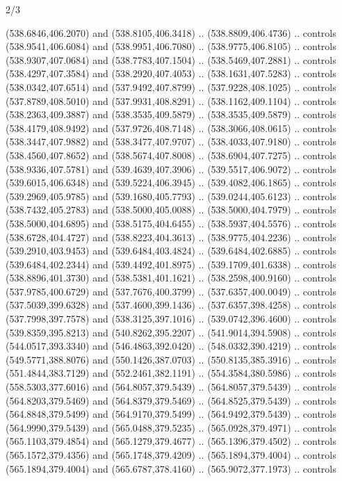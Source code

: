 \begin{flagdescription}{2/3}
\begin{scope}[xshift=0.5\flaglength,yshift=0.5\flagwidth,scale=\flagwidth/495.65]
\begin{scope}[y=0.8pt, x=0.8pt, yscale=-1,shift={(-463.76,-309.78)}]
  (538.6846,406.2070) and (538.8105,406.3418) .. (538.8809,406.4736) .. controls
  (538.9541,406.6084) and (538.9951,406.7080) .. (538.9775,406.8105) .. controls
  (538.9307,407.0684) and (538.7783,407.1504) .. (538.5469,407.2881) .. controls
  (538.4297,407.3584) and (538.2920,407.4053) .. (538.1631,407.5283) .. controls
  (538.0342,407.6514) and (537.9492,407.8799) .. (537.9228,408.1025) .. controls
  (537.8789,408.5010) and (537.9931,408.8291) .. (538.1162,409.1104) .. controls
  (538.2363,409.3887) and (538.3535,409.5879) .. (538.3535,409.5879) .. controls
  (538.4179,408.9492) and (537.9726,408.7148) .. (538.3066,408.0615) .. controls
  (538.3447,407.9882) and (538.3477,407.9707) .. (538.4033,407.9180) .. controls
  (538.4560,407.8652) and (538.5674,407.8008) .. (538.6904,407.7275) .. controls
  (538.9336,407.5781) and (539.4639,407.3906) .. (539.5517,406.9072) .. controls
  (539.6015,406.6348) and (539.5224,406.3945) .. (539.4082,406.1865) .. controls
  (539.2969,405.9785) and (539.1680,405.7793) .. (539.0244,405.6123) .. controls
  (538.7432,405.2783) and (538.5000,405.0088) .. (538.5000,404.7979) .. controls
  (538.5000,404.6895) and (538.5175,404.6455) .. (538.5937,404.5576) .. controls
  (538.6728,404.4727) and (538.8223,404.3613) .. (538.9775,404.2236) .. controls
  (539.2910,403.9453) and (539.6484,403.4824) .. (539.6484,402.6885) .. controls
  (539.6484,402.2344) and (539.4492,401.8975) .. (539.1709,401.6338) .. controls
  (538.8896,401.3730) and (538.5381,401.1621) .. (538.2598,400.9160) .. controls
  (537.9785,400.6729) and (537.7676,400.3799) .. (537.6357,400.0049) .. controls
  (537.5039,399.6328) and (537.4600,399.1436) .. (537.6357,398.4258) .. controls
  (537.7998,397.7578) and (538.3125,397.1016) .. (539.0742,396.4600) .. controls
  (539.8359,395.8213) and (540.8262,395.2207) .. (541.9014,394.5908) .. controls
  (544.0517,393.3340) and (546.4863,392.0420) .. (548.0332,390.4219) .. controls
  (549.5771,388.8076) and (550.1426,387.0703) .. (550.8135,385.3916) .. controls
  (551.4844,383.7129) and (552.2461,382.1191) .. (554.3584,380.5986) .. controls
  (558.5303,377.6016) and (564.8057,379.5439) .. (564.8057,379.5439) .. controls
  (564.8203,379.5469) and (564.8379,379.5469) .. (564.8525,379.5439) .. controls
  (564.8848,379.5499) and (564.9170,379.5499) .. (564.9492,379.5439) .. controls
  (564.9990,379.5439) and (565.0488,379.5235) .. (565.0928,379.4971) .. controls
  (565.1103,379.4854) and (565.1279,379.4677) .. (565.1396,379.4502) .. controls
  (565.1572,379.4356) and (565.1748,379.4209) .. (565.1894,379.4004) .. controls
  (565.1894,379.4004) and (565.6787,378.4160) .. (565.9072,377.1973) .. controls

\end{scope}
\end{scope}
\end{flagdescription}
